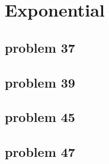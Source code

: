 \section{Exponential}

\subsection{problem 37}

\subsection{problem 39}

\subsection{problem 45}

\subsection{problem 47}

